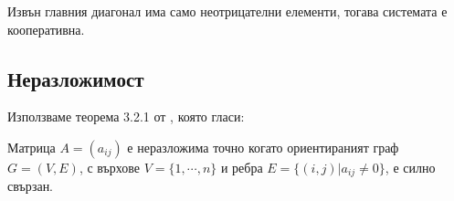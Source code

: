 Извън главния диагонал има само неотрицателни елементи, тогава системата е кооперативна.


\subsection{Неразложимост}
Използваме теорема 3.2.1 от \cite{Brualdi1991}, която гласи:
\begin{theorem}
  \label{theorem:ConnectedIrreducability}
  Матрица $A=(a_{ij})$ е неразложима точно когато ориентираният граф $G=(V,E)$, с върхове $V=\{1, \cdots, n\}$ и ребра $E=\{(i,j) \vert a_{ij} \neq 0 \}$, е силно свързан.
\end{theorem}


